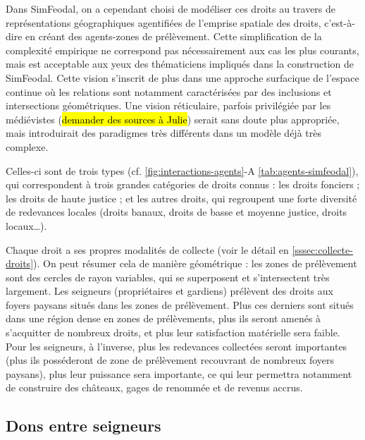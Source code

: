 \begin{tcolorbox}[breakable,left=0pt,right=0pt,top=0pt,bottom=0pt,
	colback=gray!15,colframe=gray!15,width=\dimexpr\textwidth\relax, 
	enlarge left by=0mm, boxsep=5pt,arc=0pt,outer arc=0pt]
Dans SimFeodal, on a cependant choisi de modéliser ces droits au travers de représentations géographiques agentifiées de l'emprise spatiale des droits, c'est-à-dire en créant des agents-zones de prélèvement.
Cette simplification de la complexité empirique ne correspond pas nécessairement aux cas les plus courants, mais est acceptable aux yeux des thématiciens impliqués dans la construction de SimFeodal.
Cette vision s'inscrit de plus dans une approche surfacique de l'espace continue où les relations sont notamment caractérisées par des inclusions et intersections géométriques.
Une vision réticulaire, parfois privilégiée par les médiévistes (\hl{demander des sources à Julie}) serait sans doute plus appropriée, mais introduirait des paradigmes très différents dans un modèle déjà très complexe.

Celles-ci sont de trois types (cf. \cref{fig:interactions-agents}-A \cref{tab:agents-simfeodal}), qui correspondent à trois grandes catégories de droits connus : les droits fonciers ; les droits de haute justice ; et les autres droits, qui regroupent une forte diversité de redevances locales (droits banaux, droits de basse et moyenne justice, droits locaux\ldots).

\medskip
Chaque droit a ses propres modalités de collecte (voir le détail en \cref{sssec:collecte-droits}).
On peut résumer cela de manière géométrique : les zones de prélèvement sont des cercles de rayon variables, qui se superposent et s'intersectent très largement.
Les seigneurs (propriétaires et gardiens) prélèvent des droits aux foyers paysans situés dans les zones de prélèvement.
Plus ces derniers sont situés dans une région dense en zones de prélèvements, plus ils seront amenés à s'acquitter de nombreux droits, et plus leur satisfaction matérielle sera faible.
Pour les seigneurs, à l'inverse, plus les redevances collectées seront importantes (plus ils posséderont de zone de prélèvement recouvrant de nombreux foyers paysans), plus leur puissance sera importante, ce qui leur permettra notamment de construire des châteaux, gages de renommée et de revenus accrus.
\end{tcolorbox}

\subsection{Dons entre seigneurs \label{meca-dons}}


